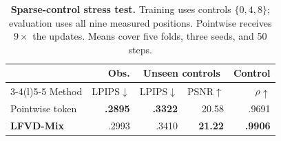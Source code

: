 \begin{table}[t]
\centering
\caption{\textbf{Sparse-control stress test.} Training uses controls
$\{0,4,8\}$; evaluation uses all nine measured positions. Pointwise receives
$9\times$ the updates. Means cover five folds, three seeds, and 50 steps.}
\label{tab:sparse_control}
\scriptsize
\setlength{\tabcolsep}{3.2pt}
\begin{tabular*}{\linewidth}{@{\extracolsep{\fill}}lrrrr@{}}
\toprule
& Obs. & \multicolumn{2}{c}{Unseen controls} & Control \\
\cmidrule(lr){3-4}\cmidrule(l){5-5}
Method & LPIPS$\downarrow$ & LPIPS$\downarrow$ & PSNR$\uparrow$ & $\rho\uparrow$ \\
\midrule
Pointwise token & \textbf{.2895} & \textbf{.3322} & 20.58 & .9691 \\
\textbf{LFVD-Mix} & .2993 & .3410 & \textbf{21.22} & \textbf{.9906} \\
\bottomrule
\end{tabular*}
\end{table}
